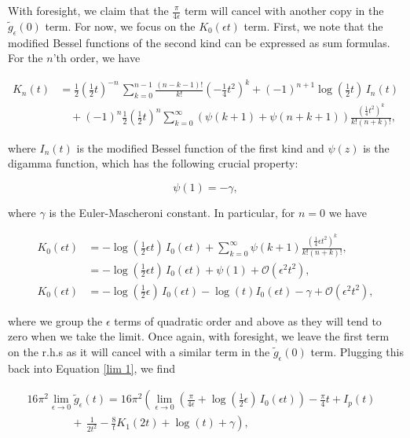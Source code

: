 \documentclass{article}
\numberwithin{equation}{section} %
\begin{document}
\noindent With foresight, we claim that the $\frac{\pi}{4\epsilon}$ term will cancel with another copy in the $\tilde{g}_\epsilon(0)$ term. For now, we focus on the $K_0(\epsilon t)$ term. First, we note that the modified Bessel functions of the second kind can be expressed as sum formulas\cite{bessel}. For the $n$'th order, we have

\begin{equation}
\begin{split}
K_n(t) &= \frac{1}{2}\left(\frac{1}{2}t\right)^{-n} \, \sum^{n-1}_{k=0}\frac{(n-k-1)!}{k!}(-\frac{1}{4}t^2)^k + (-1)^{n+1} \log(\frac{1}{2}t)\, I_n(t) \\
& \quad + (-1)^n\frac{1}{2}\left(\frac{1}{2}t\right)^n\sum^\infty_{k=0}\left( \psi(k+1) + \psi(n+k+1) \right)\frac{(\frac{1}{4}t^2)^k}{k!(n+k)!},
\end{split}
\end{equation}

\noindent where $I_n(t)$ is the modified Bessel function of the first kind\cite{bessel1} and $\psi(z)$ is the digamma function\cite{digamma}, which has the following crucial property:

\begin{equation}
\psi(1) = -\gamma,
\end{equation}

\noindent where $\gamma$ is the Euler-Mascheroni constant\cite{euler-mascheroni}. In particular, for $n=0$ we have

\begin{equation}
\begin{split}
K_0(\epsilon t) &= -\log(\frac{1}{2}\epsilon t)\, I_0(\epsilon t) 
+ \sum^\infty_{k=0}\psi(k+1)\frac{(\frac{1}{4}\epsilon t^2)^k}{k!(n+k)!},\\
&= -\log(\frac{1}{2}\epsilon t)\, I_0(\epsilon t) +  \psi(1) + \mathcal{O}(\epsilon^2t^2),\\
K_0(\epsilon t)&= -\log(\frac{1}{2}\epsilon)\, I_0(\epsilon t) - \log(t)I_0(\epsilon t) - \gamma + \mathcal{O}(\epsilon^2t^2),
\end{split}
\end{equation}

\noindent where we group the $\epsilon$ terms of quadratic order and above as they will tend to zero when we take the limit. Once again, with foresight, we leave the first term on the r.h.s as it will cancel with a similar term in the $\tilde{g}_\epsilon(0)$ term. Plugging this back into Equation \ref{lim 1}, we find

\begin{equation}
\begin{split}
16\pi^2 \lim_{\epsilon\rightarrow 0} \tilde{g}_\epsilon(t) = 16\pi^2 \left( \lim_{\epsilon\rightarrow 0} \left( \frac{\pi}{4\epsilon} +\log(\frac{1}{2}\epsilon)\, I_0(\epsilon t)\right) - \frac{\pi}{4} t + I_p(t)  \right. &\\
 \left. \quad \quad \quad \quad + \, \frac{1}{2t^2} - \frac{8}{t}K_1(2t) + \log(t) + \gamma \right),&
\end{split}
\label{lim 11}
\end{equation}
\end{document}

